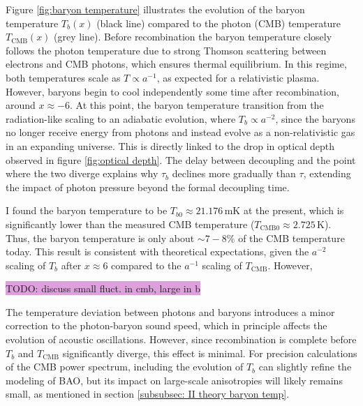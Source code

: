 \documentclass{aa}
\numberwithin{equation}{section}
\numberwithin{table}{section}
\numberwithin{figure}{section}
\begin{document}
Figure \ref{fig:baryon temperature} illustrates the evolution of the baryon temperature $T_b(x)$ (black line) compared to the photon (CMB) temperature $T_\text{CMB}(x)$ (grey line). Before recombination the baryon temperature closely follows the photon temperature due to strong Thomson scattering between electrons and CMB photons, which ensures thermal equilibrium. In this regime, both temperatures scale as $T \propto a^{-1}$, as expected for a relativistic plasma. However, 
baryons begin to cool independently some time after recombination, around $x\approx-6$. At this point, the baryon temperature transition from the radiation-like scaling to an adiabatic evolution, where $T_b \propto a^{-2}$, since the baryons no longer receive energy from photons and instead evolve as a non-relativistic gas in an expanding universe. This is directly linked to the drop in optical depth observed in figure \ref{fig:optical depth}. The delay between decoupling and the point where the two diverge explains why $\tau_b$ declines more gradually than $\tau$, extending the impact of photon pressure beyond the formal decoupling time. 

I found the baryon temperature to be $T_{b0} \approx 21.176\,\text{mK}$ at the present, which is significantly lower than the measured CMB temperature ($T_\text{CMB0} \approx 2.725\,$K). Thus, the baryon temperature is only about $\sim 7-8\%$ of the CMB temperature today. This result is consistent with theoretical expectations, given the $a^{-2}$ scaling of $T_b$ after $x\approx 6$ compared to the $a^{-1}$ scaling of $T_\text{CMB}$. However, 

\colorbox{Plum}{TODO: discuss small fluct. in cmb, large in b}

The temperature deviation between photons and baryons introduces a minor correction to the photon-baryon sound speed, which in principle affects the evolution of acoustic oscillations. However, since recombination is complete before $T_b$ and $T_\text{CMB}$ significantly diverge, this effect is minimal. For precision calculations of the CMB power spectrum, including the evolution of $T_b$ can slightly refine the modeling of BAO, but its impact on large-scale anisotropies will likely remains small, as mentioned in section \ref{subsubsec: II theory baryon temp}.
\end{document}
